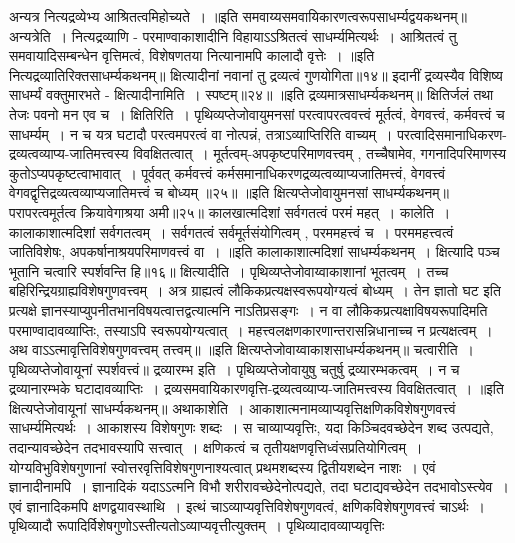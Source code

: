 अन्यत्र नित्यद्रव्येभ्य आश्रितत्वमिहोच्यते~।
॥इति समवाय्यसमवायिकारणत्वरूपसाधर्म्यद्वयकथनम्॥
अन्यत्रेति~। नित्यद्रव्याणि - परमाण्वाकाशादीनि विहायाऽऽश्रितत्वं साधर्म्यमित्यर्थः~। आश्रितत्वं तु समवायादिसम्बन्धेन वृत्तिमत्वं, विशेषणतया नित्यानामपि
कालादौ वृत्तेः~।
॥इति नित्यद्रव्यातिरिक्तसाधर्म्यकथनम्॥
क्षित्यादीनां नवानां तु द्रव्यत्वं गुणयोगिता॥१४॥
इदानीं द्रव्यस्यैव विशिष्य साधर्म्यं वक्तुमारभते - क्षित्यादीनामिति~। स्पष्टम्॥२४॥
॥इति द्रव्यमात्रसाधर्म्यकथनम्॥
क्षितिर्जलं तथा तेजः पवनो मन एव च~।
क्षितिरिति~। पृथिव्यप्तेजोवायुमनसां परत्वापरत्ववत्त्वं मूर्तत्वं, वेगवत्त्वं, कर्मवत्त्वं च साधर्म्यम्~। न च यत्र घटादौ परत्वमपरत्वं वा नोत्पन्नं, तत्राऽव्याप्तिरिति
वाच्यम्~। परत्वादिसमानाधिकरण-द्रव्यत्वव्याप्य-जातिमत्त्वस्य विवक्षितत्वात्~। मूर्तत्वम्-अपकृष्टपरिमाणवत्त्वम् , तच्चैषामेव, गगनादिपरिमाणस्य कुतोऽप्यपकृष्टत्वाभावात्~।
पूर्ववत् कर्मवत्त्वं कर्मसमानाधिकरणद्रव्यत्वव्याप्यजातिमत्त्वं, वेगवत्त्वं वेगवद्वृत्तिद्रव्यत्वव्याप्यजातिमत्त्वं च बोध्यम् ॥२५॥
॥इति क्षित्यप्तेजोवायुमनसां साधर्म्यकथनम्॥
परापरत्वमूर्तत्व क्रियावेगाश्रया अमी॥२५॥
कालखात्मदिशां सर्वगतत्वं परमं महत्~।
कालेति~। कालाकाशात्मदिशां सर्वगतत्वम्~। सर्वगतत्वं सर्वमूर्तसंयोगित्वम् , परममहत्त्वं च~। परममहत्त्वत्वं जातिविशेषः, अपकर्षानाश्रयपरिमाणवत्त्वं वा~।
॥इति कालाकाशात्मदिशां साधर्म्यकथनम्~।
क्षित्यादि पञ्च भूतानि चत्वारि स्पर्शवन्ति हि॥१६॥
क्षित्यादीति~। पृथिव्यप्तेजोवाय्वाकाशानां भूतत्वम्~। तच्च बहिरिन्द्रियग्राह्यविशेषगुणवत्त्वम्~। अत्र ग्राह्यत्वं लौकिकप्रत्यक्षस्वरूपयोग्यत्वं बोध्यम्~। तेन ज्ञातो घट
इति प्रत्यक्षे ज्ञानस्याप्युपनीतभानविषयत्वात्तद्वत्यात्मनि नाऽतिप्रसङ्गः~। न वा लौकिकप्रत्यक्षाविषयरूपादिमति परमाण्वादावव्याप्तिः, तस्याऽपि स्वरूपयोग्यत्वात्~।
महत्त्वलक्षणकारणान्तरासन्निधानाच्च न प्रत्यक्षत्वम्~। अथ वाऽऽत्मावृत्तिविशेषगुणवत्त्वम् तत्त्वम्॥
॥इति क्षित्यप्तेजोवाय्वाकाशसाधर्म्यकथनम्॥
चत्वारीति~। पृथिव्यप्तेजोवायूनां स्पर्शवत्त्वं॥
द्रव्यारम्भ इति~। पृथिव्यप्तेजोवायुषु चतुर्षु द्रव्यारम्भकत्वम्~। न च द्रव्यानारम्भके घटादावव्याप्तिः~। द्रव्यसमवायिकारणवृत्ति-द्रव्यत्वव्याप्य-जातिमत्त्वस्य विवक्षितत्वात्~।
॥इति क्षित्यप्तेजोवायूनां साधर्म्यकथनम्॥
अथाकाशेति~। आकाशात्मनामव्याप्यवृत्तिक्षणिकविशेषगुणवत्त्वं साधर्म्यमित्यर्थः~। आकाशस्य विशेषगुणः शब्दः~। स चाव्याप्यवृत्तिः, यदा किञ्चिदवच्छेदेन
शब्द उत्पद्यते, तदान्यावच्छेदेन तदभावस्यापि सत्त्वात्~। क्षणिकत्वं च तृतीयक्षणवृत्तिध्वंसप्रतियोगित्वम्~। योग्यविभुविशेषगुणानां स्वोत्तरवृत्तिविशेषगुणनाश्यत्वात्
प्रथमशब्दस्य द्वितीयशब्देन नाशः~। एवं ज्ञानादीनामपि~। ज्ञानादिकं यदाऽऽत्मनि विभौ शरीरावच्छेदेनोत्पद्यते, तदा घटाद्यवच्छेदेन तदभावोऽस्त्येव~। एवं ज्ञानादिकमपि
क्षणद्वयावस्थाथि~। इत्थं चाऽव्याप्यवृत्तिविशेषगुणवत्वं, क्षणिकविशेषगुणवत्त्वं चाऽर्थः~। पृथिव्यादौ रूपादिर्विशेषगुणोऽस्तीत्यतोऽव्याप्यवृत्तीत्युक्तम्~। पृथिव्यादावव्याप्यवृत्तिः
